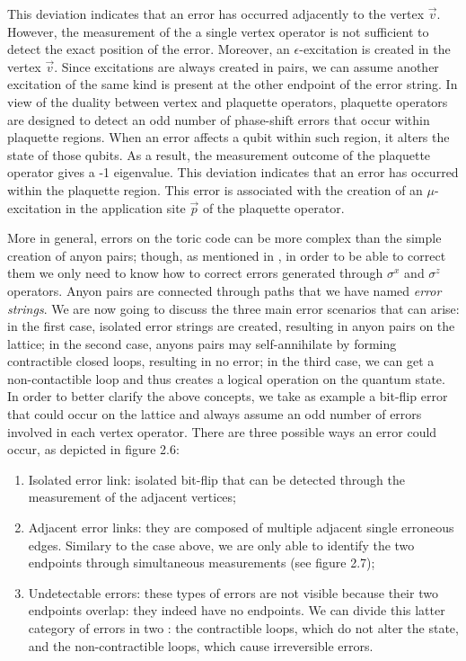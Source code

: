\documentclass{Configuration_Files/PoliMi3i_thesis}
\begin{document}
This deviation indicates that an error has occurred adjacently to the vertex $\vec{v}$. However, the measurement of the a single vertex operator is not sufficient to detect the exact position of the error. Moreover, an $\epsilon$-excitation is created in the vertex $\vec{v}$. Since excitations are always created in pairs, we can assume another excitation of the same kind is present at the other endpoint of the error string. \newline
In view of the duality between vertex and plaquette operators, plaquette operators are designed to detect an odd number of phase-shift errors that occur within plaquette regions. When an error affects a qubit within such region, it alters the state of those qubits. As a result, the measurement outcome of the plaquette operator gives a -1 eigenvalue. This deviation indicates that an error has occurred within the plaquette region. This error is associated with the creation of an $\mu$-excitation in the application site $\vec{p}$ of the plaquette operator. \newline

More in general, errors on the toric code can be more complex than the simple creation of anyon pairs; though, as mentioned in \cite{Kas19,Bro14}, in order to be able to correct them we only need to know how to correct errors generated through $\sigma^x$ and $\sigma^z$ operators. Anyon pairs are connected through paths that we have named {\it error strings}. We are now going to discuss the three main error scenarios that can arise: in the first case, isolated error strings are created, resulting in anyon pairs on the lattice; in the second case, anyons pairs may self-annihilate by forming contractible closed loops, resulting in no error; in the third case, we can get a non-contactible loop and thus creates a logical operation on the quantum state. \newline
In order to better clarify the above concepts, we take as example a bit-flip error that could occur on the lattice and always assume an odd number of errors involved in each vertex operator. There are three possible ways an error could occur, as depicted in figure 2.6: 

\begin{enumerate}
	\item Isolated error link: isolated bit-flip that can be detected through the measurement of the adjacent vertices;
	
	\item Adjacent error links: they are composed of multiple adjacent single erroneous edges. Similary to the case above, we are only able to identify the two endpoints through simultaneous measurements (see figure 2.7);
	
	\item Undetectable errors: these types of errors are not visible because their two endpoints overlap: they indeed have no endpoints. We can divide this latter category of errors in two : the contractible loops, which do not alter the state, and the non-contractible loops, which cause irreversible errors.
	
\end{enumerate}
\end{document}

